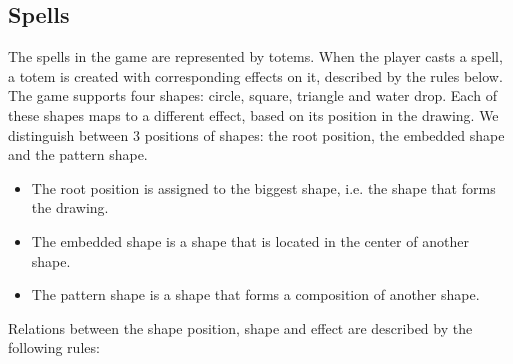 \subsection{Spells}
The spells in the game are represented by totems. When the player casts a spell, a totem is created with corresponding effects on it, described by the rules below.
The game supports four shapes: circle, square, triangle and water drop. Each of these shapes maps to a different effect, based on its position in the drawing. We distinguish between 3 positions of shapes: the root position, the embedded shape and the pattern shape.
\begin{itemize}
\item The root position is assigned to the biggest shape, i.e. the shape that forms the drawing. 
\item The embedded shape is a shape that is located in the center of another shape. 
\item The pattern shape is a shape that forms a composition of another shape.
\end{itemize}
Relations between the shape position, shape and effect are described by the following rules:
